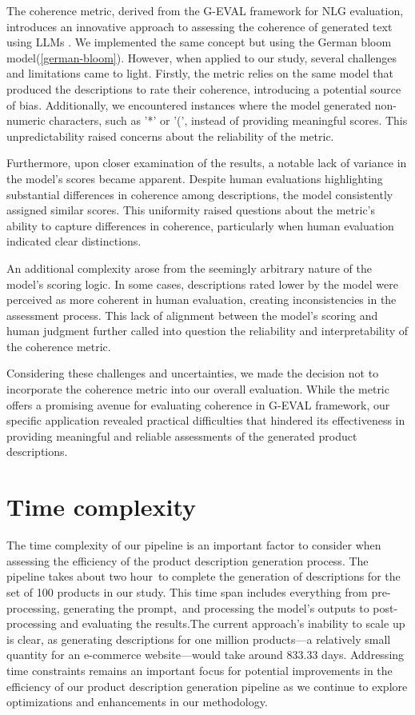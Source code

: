 The coherence metric, derived from the G-EVAL framework for NLG evaluation, introduces an innovative approach to assessing the coherence of generated text using LLMs \cite{liu2023geval}. We implemented the same concept but using the German bloom model(\autoref{german-bloom}). However, when applied to our study, several challenges and limitations came to light. Firstly, the metric relies on the same model that produced the descriptions to rate their coherence, introducing a potential source of bias. Additionally, we encountered instances where the model generated non-numeric characters, such as '*' or '(', instead of providing meaningful scores. This unpredictability raised concerns about the reliability of the metric.

Furthermore, upon closer examination of the results, a notable lack of variance in the model's scores became apparent. Despite human evaluations highlighting substantial differences in coherence among descriptions, the model consistently assigned similar scores. This uniformity raised questions about the metric's ability to capture differences in coherence, particularly when human evaluation indicated clear distinctions.

An additional complexity arose from the seemingly arbitrary nature of the model's scoring logic. In some cases, descriptions rated lower by the model were perceived as more coherent in human evaluation, creating inconsistencies in the assessment process. This lack of alignment between the model's scoring and human judgment further called into question the reliability and interpretability of the coherence metric.

Considering these challenges and uncertainties, we made the decision not to incorporate the coherence metric into our overall evaluation. While the metric offers a promising avenue for evaluating coherence in G-EVAL framework, our specific application revealed practical difficulties that hindered its effectiveness in providing meaningful and reliable assessments of the generated product descriptions.

\section{Time complexity}

The time complexity of our pipeline is an important factor to consider when assessing the efficiency of the product description generation process. The pipeline takes about two hour to complete the generation of descriptions for the set of 100 products in our study. This time span includes everything from pre-processing, generating the prompt, and processing the model's outputs to post-processing and evaluating the results.The current approach's inability to scale up is clear, as generating descriptions for one million products—a relatively small quantity for an e-commerce website—would take around 833.33 days. Addressing time constraints remains an important focus for potential improvements in the efficiency of our product description generation pipeline as we continue to explore optimizations and enhancements in our methodology.

